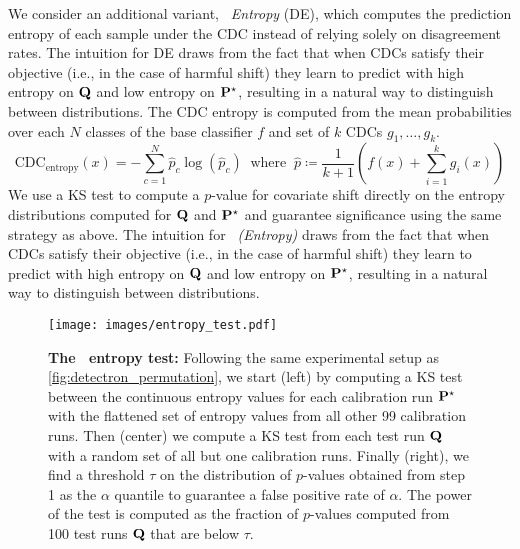 We consider an additional variant, \textit{\method\ Entropy} (DE), which computes the prediction entropy of each sample under the CDC instead of relying solely on disagreement rates.
The intuition for DE draws from the fact that when CDCs satisfy their objective (i.e., in the case of harmful shift) they
learn to predict with high entropy on $\mathbf{Q}$ and low entropy on $\mathbf{P}^\star$, resulting in a natural way to distinguish between distributions.
The CDC entropy is computed from the mean probabilities over each $N$ classes of the base classifier $f$ and set of $k$ CDCs $g_1,\dots,g_k$.
\begin{equation}
    \text{CDC}_{\text{entropy}}(x)=-\sum_{c=1}^N {\hat{p}_c\log(\hat{p}_c)}\ \text{ where }\ \hat{p} \coloneqq \frac{1}{k+1}\left(f(x) + \sum_{i=1}^k g_i(x)\right)
    \label{eq:cdc_entropy_def}
\end{equation}
We use a KS test to compute a $p$-value for covariate shift directly on the entropy distributions computed for $\mathbf{Q}$ and $\mathbf{P}^\star$ and guarantee significance using the same strategy as above.
The intuition for \textit{\method\ (Entropy)} draws from the fact that when CDCs satisfy their objective (i.e., in the case of harmful shift) they
learn to predict with high entropy on $\mathbf{Q}$ and low entropy on $\mathbf{P}^\star$, resulting in a natural way to distinguish between distributions.

\begin{figure}[!htb]
    \centering
    \texttt{[image: images/entropy\_test.pdf]}
    \caption{\textbf{The \method\ entropy test:} Following the same experimental setup as \autoref{fig:detectron_permutation}, we start (left) by computing a KS test between the continuous entropy values for each calibration run $\mathbf{P}^\star$ with the flattened set of entropy values from all other 99 calibration runs. Then (center) we compute a KS test from each test run $\mathbf{Q}$ with a random set of all but one calibration runs. Finally (right), we find a threshold $\tau$ on the distribution of $p$-values obtained from step 1 as the $\alpha$ quantile to guarantee a false positive rate of $\alpha$. The power of the test is computed as the fraction of $p$-values computed from 100 test runs $\mathbf{Q}$ that are below $\tau$.}
    \label{fig:entropy_test}
\end{figure}


